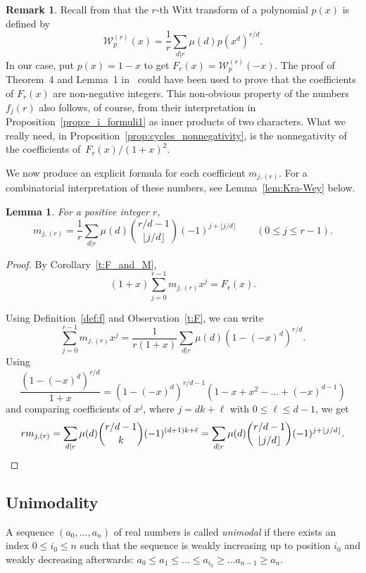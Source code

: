 \documentclass[10pt]{article}
\newtheorem{lemma}[theorem]{Lemma}
\theoremstyle{definition}
\newtheorem{remark}[theorem]{Remark}
\begin{document}
\begin{remark}
    Recall from \cite{Moree} that the $r$-th Witt transform of a polynomial $p(x)$ is defined by 
    \[
        \mathcal{W}_p^{(r)}(x)=\frac{1}{r}\sum_{d|r}\mu(d)p(x^d)^{r/d}.
    \] 
    In our case, put $p(x)=1-x$ to get $F_r(x) = \mathcal{W}_p^{(r)}(-x)$. 
    The proof of Theorem~4 and Lemma~1 in~\cite{Moree} could have been used to prove that the coefficients of $F_r(x)$ are non-negative integers. This non-obvious property of the numbers $f_j(r)$ also follows, of course, from their interpretation in Proposition~\ref{prop:e_i_formuli1} as inner products of two characters.
    What we really need, in Proposition~\ref{prop:cycles_nonnegativity}, is the nonnegativity of the coefficients of~$F_r(x)/(1+x)^2$.
\end{remark}

We now produce an explicit formula for each coefficient $m_{j,(r)}$. For a combinatorial interpretation of these numbers, see Lemma~\ref{lem:Kra-Wey} below.

\begin{lemma}\label{t:m_formula}
    For a positive integer $r$,
    \[
		m_{j,(r)}
		= \frac{1}{r} \sum_{d|r} \mu(d) \binom{r/d - 1}{\lfloor j/d \rfloor}  (-1)^{j+\lfloor j/d \rfloor} 
		\qquad (0 \le j \le r-1).
    \]
\end{lemma}
\begin{proof}
	By Corollary~\ref{t:F_and_M},
	\[
	    (1+x) \sum_{j=0}^{r-1} m_{j,(r)}x^j=F_r(x). 
	\]
	
	Using Definition~\ref{def:f} and Observation~\ref{t:F},
	we can write
	\[
	    \sum_{j=0}^{r-1} m_{j,(r)} x^j 
	    = \frac{1}{r(1+x)} \sum_{d|r} \mu(d) (1-(-x)^d)^{r/d}.
    \]
	Using
	\[
		\frac{(1-(-x)^d)^{r/d}}{1+x} 
		= (1-(-x)^d)^{r/d-1} (1 - x + x^2 - \ldots +(-x)^{d-1})
	\]
	and comparing coefficients of $x^j$, where $j = dk + \ell$ with $0 \le \ell \le d-1$, we get
	\[
		r m_{j,(r)}
		= \sum_{d|r} \mu(d) \binom{r/d - 1}{k}  (-1)^{(d+1)k + \ell}
		= \sum_{d|r} \mu(d) \binom{r/d - 1}{\lfloor j/d \rfloor}  (-1)^{j+\lfloor j/d \rfloor}.
        \qedhere
	\]
\end{proof}


\subsection{Unimodality}
\label{sec:unimodality}
	
A sequence $(a_0,\ldots,a_n)$ of real numbers is called {\em unimodal} if there exists an index $0 \le i_0 \le n$ such that the sequence is weakly increasing up to position $i_0$ and weakly decreasing afterwards:
$a_0 \le a_1 \le \ldots \le a_{i_0} \ge \ldots a_{n-1} \ge a_n$.
	
\end{document}
